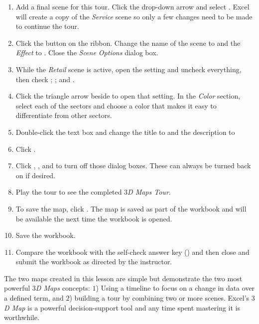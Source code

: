 \begin{enumerate}
	\item Add a final scene for this tour. Click the  drop-down arrow and select . Excel will create a copy of the \textit{Service} scene so only a few changes need to be made to continue the tour.
	\item Click the  button on the ribbon. Change the name of the scene to  and the \textit{Effect} to . Close the \textit{Scene Options} dialog box.
	\item While the \textit{Retail} scene is active, open the  setting and uncheck everything, then check ; ; and .
	\item Click the triangle arrow beside  to open that setting. In the \textit{Color} section, select each of the sectors and choose a color that makes it easy to differentiate from other sectors.
	\item Double-click the text box and change the title to  and the description to 
	\item Click .
	
	\item Click , , and  to turn off those dialog boxes. These can always be turned back on if desired.
	\item Play the tour to see the completed \textit{$ 3 $D Maps Tour}.
	\item To save the map, click . The map is saved as part of the workbook and will be available the next time the workbook is opened.

	\item Save the  workbook.
	\item Compare the workbook with the self-check answer key () and then close and submit the  workbook as directed by the instructor.
	
\end{enumerate}

The two maps created in this lesson are simple but demonstrate the two most powerful \textit{$ 3 $D Maps} concepts: $ 1 $) Using a timeline to focus on a change in data over a defined term, and $ 2 $) building a tour by combining two or more scenes. Excel's \textit{$ 3 $D Map} is a powerful decision-support tool and any time spent mastering it is worthwhile.

